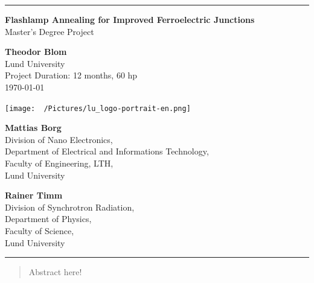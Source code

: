 \documentclass[11pt]{article}
\begin{document}
	\begin{titlepage}
		\begin{center}
			\hrule
			\vspace*{1cm}
			
			\textbf{\LARGE{Flashlamp Annealing for Improved Ferroelectric Junctions}}\\ 
			\vspace{0.5cm}
			\Large{Master's Degree Project}
			
			\vspace{1.5cm}
			
			\textbf{\Large{Theodor Blom}} \\
			\small{Lund University} \\
			\vspace{0.2cm}
            \small{Project Duration: 12 months, 60 hp}\\
            \vspace{0.2cm}
			\small{\today}
			
			\vfill
			
			\texttt{[image: ~/Pictures/lu\_logo-portrait-en.png]}
			
			\vspace{1cm}

            \begin{minipage}{0.51\textwidth}
                \centering
                \textbf{\Large{Mattias Borg}} \\
			    \vspace{0.2cm}
                Division of Nano Electronics,\\
                Department of Electrical and Informations Technology,\\
                Faculty of Engineering, LTH,\\
			    Lund University\\
            \end{minipage}
            \begin{minipage}{0.48\textwidth}
                \centering
                \textbf{\Large{Rainer Timm}} \\
			    \vspace{0.2cm}
                Division of Synchrotron Radiation,\\
                Department of Physics,\\
                Faculty of Science,\\
			    Lund University\\
            \end{minipage}
			\vspace{1cm}
			\hrule
		\end{center}
	\end{titlepage}
\newpage
    \thispagestyle{empty}
    \mbox{}
\newpage
    \tableofcontents
    \begin{abstract}
        Abstract here!
    \end{abstract}
\newpage {}
\end{document}
